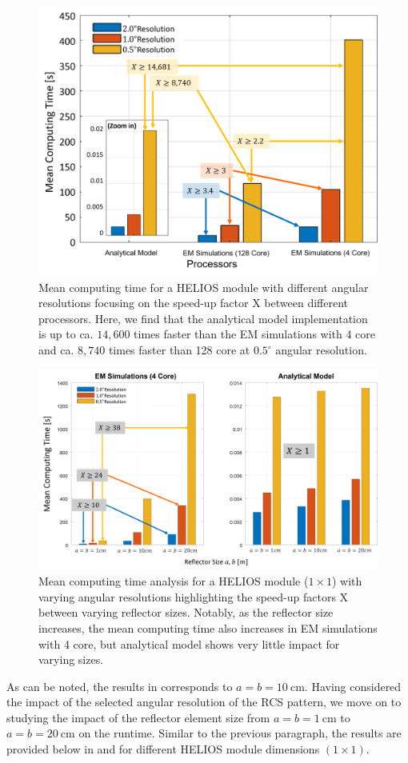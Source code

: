 \begin{figure}[H]
	\centering
	\includegraphics[width=0.75\linewidth]{images/Section 4 Images/Computing_time_cores}
	\caption{Mean computing time for a HELIOS module with different angular resolutions focusing on the speed-up factor X between different processors. Here, we find that the analytical model implementation is up to ca. $14,600$ times faster than the EM simulations with 4 core and ca. $8,740$ times faster than 128 core at $\num{0.5}^\circ$ angular resolution.}
	\label{fig:Computing_time_cores}
\end{figure}
\begin{figure}[H]
	\centering
	\includegraphics[width=0.85\linewidth]{images/Section 4 Images/Computing_time_size}
	\caption{Mean computing time analysis for a HELIOS module ($1 \times 1$) with varying angular resolutions highlighting the speed-up factors X between varying reflector sizes. Notably, as the reflector size increases, the mean computing time also increases in EM simulations with 4 core, but analytical model shows very little impact for varying sizes. }
	\label{fig:Computing_time_size}
\end{figure}
As can be noted, the results in  corresponds to $a=b=\SI{10}{\centi\meter}$. Having considered the impact of the selected angular resolution of the RCS pattern, we move on to studying the impact of the reflector element size from $a=b=\SI{1}{\centi\meter}$ to $a=b=\SI{20}{\centi\meter}$ on the runtime. Similar to the previous paragraph, the results are provided below in  and  for different HELIOS module dimensions $(1 \times 1)$.

